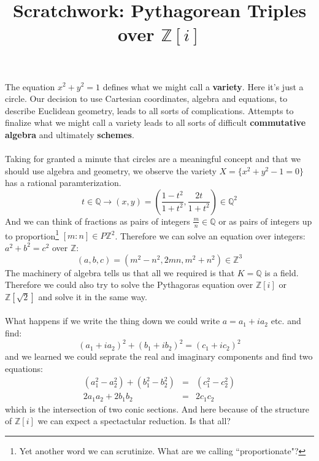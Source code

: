 \documentclass[12pt]{article}
\title{Scratchwork: Pythagorean Triples over $\mathbb{Z}[i]$}
\date{}
\begin{document}

\sffamily

\maketitle

\noindent The equation $x^2 + y^2 = 1$ defines what we might call a \textbf{variety}.  Here it's just a circle.  Our decision to use Cartesian coordinates, algebra and equations, to describe Euclidean geometry, leads to all sorts of complications.  Attempts to finalize what we might call a variety leads to all sorts of difficult \textbf{commutative algebra} and ultimately \textbf{schemes}.  \\ \\
Taking for granted a minute that circles are a meaningful concept and that we should use algebra and geometry, we observe the variety $X = \{ x^2 + y^2 - 1 = 0\}$ has a rational paramterization.
$$ t \in \mathbb{Q}  \longrightarrow (x,y) = \left( \frac{1-t^2}{1 + t^2}, \frac{2t}{1+t^2} \right) \in \mathbb{Q}^2 $$
And we can think of fractions as pairs of integers $\frac{m}{n} \in \mathbb{Q}$ or as pairs of integers up to proportion\footnote{Yet another word we can scrutinize.  What are we calling ``proportionate"? } $[m:n] \in P\mathbb{Z}^2$.  Therefore we can solve an equation over integers: $a^2 + b^2 = c^2$ over $\mathbb{Z}$:
$$ (a,b,c) = (m^2 - n^2, 2mn, m^2 + n^2) \in \mathbb{Z}^3$$ 
The machinery of algebra tells us that all we required is that $K = \mathbb{Q}$ is a field.  Therefore we could also try to solve the Pythagoras equation over $\mathbb{Z}[i]$ or $\mathbb{Z}[\sqrt{2}]$ and solve it in the same way. \\ \\
What happens if we write the thing down we could write $a = a_1 + i a_2$ etc. and find:
$$ (a_1 + i a_2)^2 + (b_1 + i b_2)^2 = (c_1 + i c_2)^2 $$
and we learned we could seprate the real and imaginary components and find two equations:
\begin{eqnarray*}
(a_1^2 - a_2^2) + (b_1^2 - b_2^2)  &=& (c_1^2 - c_2^2) \\
2a_1 a_2 + 2 b_1 b_2 &=& 2 c_1 c_2 
\end{eqnarray*}
which is the intersection of two conic sections.  And here because of the structure of $\mathbb{Z}[i]$ we can expect a spectactular reduction.  Is that all?
\end{document}

